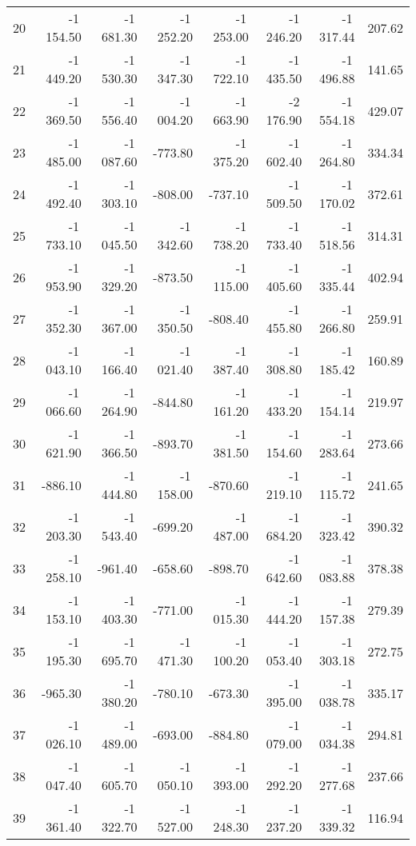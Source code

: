 \begin{longtable}{rrrrrrrr}
20 & -1\,154.50 & -1\,681.30 & -1\,252.20 & -1\,253.00 & -1\,246.20 & -1\,317.44 & 207.62  \\
21 & -1\,449.20 & -1\,530.30 & -1\,347.30 & -1\,722.10 & -1\,435.50 & -1\,496.88 & 141.65  \\
22 & -1\,369.50 & -1\,556.40 & -1\,004.20 & -1\,663.90 & -2\,176.90 & -1\,554.18 & 429.07  \\
23 & -1\,485.00 & -1\,087.60 & -773.80 & -1\,375.20 & -1\,602.40 & -1\,264.80 & 334.34  \\
24 & -1\,492.40 & -1\,303.10 & -808.00 & -737.10 & -1\,509.50 & -1\,170.02 & 372.61  \\
25 & -1\,733.10 & -1\,045.50 & -1\,342.60 & -1\,738.20 & -1\,733.40 & -1\,518.56 & 314.31  \\
26 & -1\,953.90 & -1\,329.20 & -873.50 & -1\,115.00 & -1\,405.60 & -1\,335.44 & 402.94  \\
27 & -1\,352.30 & -1\,367.00 & -1\,350.50 & -808.40 & -1\,455.80 & -1\,266.80 & 259.91  \\
28 & -1\,043.10 & -1\,166.40 & -1\,021.40 & -1\,387.40 & -1\,308.80 & -1\,185.42 & 160.89  \\
29 & -1\,066.60 & -1\,264.90 & -844.80 & -1\,161.20 & -1\,433.20 & -1\,154.14 & 219.97  \\
30 & -1\,621.90 & -1\,366.50 & -893.70 & -1\,381.50 & -1\,154.60 & -1\,283.64 & 273.66  \\
31 & -886.10 & -1\,444.80 & -1\,158.00 & -870.60 & -1\,219.10 & -1\,115.72 & 241.65  \\
32 & -1\,203.30 & -1\,543.40 & -699.20 & -1\,487.00 & -1\,684.20 & -1\,323.42 & 390.32  \\
33 & -1\,258.10 & -961.40 & -658.60 & -898.70 & -1\,642.60 & -1\,083.88 & 378.38  \\
34 & -1\,153.10 & -1\,403.30 & -771.00 & -1\,015.30 & -1\,444.20 & -1\,157.38 & 279.39  \\
35 & -1\,195.30 & -1\,695.70 & -1\,471.30 & -1\,100.20 & -1\,053.40 & -1\,303.18 & 272.75  \\
36 & -965.30 & -1\,380.20 & -780.10 & -673.30 & -1\,395.00 & -1\,038.78 & 335.17  \\
37 & -1\,026.10 & -1\,489.00 & -693.00 & -884.80 & -1\,079.00 & -1\,034.38 & 294.81  \\
38 & -1\,047.40 & -1\,605.70 & -1\,050.10 & -1\,393.00 & -1\,292.20 & -1\,277.68 & 237.66  \\
39 & -1\,361.40 & -1\,322.70 & -1\,527.00 & -1\,248.30 & -1\,237.20 & -1\,339.32 & 116.94  \\

\end{longtable}
